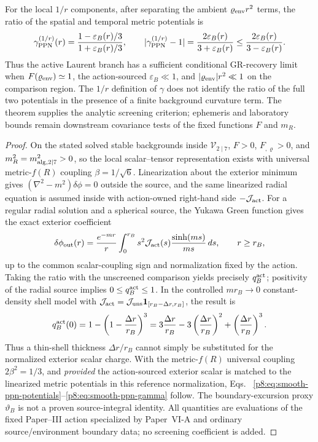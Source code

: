 \documentclass[12pt,a4paper]{article}
\begin{document}
\begin{theorem}
For the local \(1/r\) components, after separating the ambient
\(\varrho_{\rm env}r^2\) terms, the ratio of the spatial and temporal
metric potentials is
\begin{equation}
\label{p8:eq:smooth-ppn-gamma}
 \gamma_{\rm PPN}^{(1/r)}(r)
 =\frac{1-\varepsilon_B(r)/3}{1+\varepsilon_B(r)/3},
 \qquad
 |\gamma_{\rm PPN}^{(1/r)}-1|
 =\frac{2\varepsilon_B(r)}{3+\varepsilon_B(r)}
 \le\frac{2\varepsilon_B(r)}{3-\varepsilon_B(r)}.
\end{equation}
Thus the active Laurent branch has a sufficient conditional GR-recovery
limit when $F(\varrho_{\rm env})\simeq1$, the action-sourced
$\varepsilon_B\ll1$, and $|\varrho_{\rm env}|r^2\ll1$ on the comparison
region. The \(1/r\) definition of \(\gamma\) does not identify the
ratio of the full two potentials in the presence of a finite background
curvature term.  The theorem supplies the analytic screening
criterion; ephemeris and laboratory bounds remain downstream covariance tests
of the fixed functions $F$ and $m_R$.
\end{theorem}

\begin{proof}
On the stated solved stable backgrounds inside \(\mathscr V_{2\mid7}\),
\(F>0\), \(F_{,\varrho}>0\), and
\(m_R^2=m_{{\rm alg},2\mid7}^2>0\), so the local
scalar--tensor representation exists with universal metric-$f(R)$ coupling
$\beta=1/\sqrt6$.  Linearization about the exterior minimum gives
$(\nabla^2-m^2)\delta\phi=0$ outside the source, and the same
linearized radial equation is assumed inside with action-owned right-hand
side \(-\mathcal J_{\rm act}\). For a regular radial solution and a
spherical source, the Yukawa Green function gives the exact exterior
coefficient
\[
 \delta\phi_{\rm out}(r)=\frac{e^{-mr}}r
 \int_0^{r_B}s^2\mathcal J_{\rm act}(s)
                 \frac{\sinh(ms)}{ms}\,ds,
 \qquad r\geq r_B,
\]
up to the common scalar-coupling sign and normalization fixed by the
action. Taking the ratio with the unscreened comparison yields precisely
\(q_B^{\rm act}\); positivity of the radial source implies
\(0\leq q_B^{\rm act}\leq1\). In the controlled \(m r_B\to0\)
constant-density shell model with \(\mathcal J_{\rm act}=
\mathcal J_{\rm uns}\mathbf1_{[r_B-\Delta r,r_B]}\), the result is
\[
 q_B^{\rm act}(0)=1-\left(1-\frac{\Delta r}{r_B}\right)^3
  =3\frac{\Delta r}{r_B}
   -3\left(\frac{\Delta r}{r_B}\right)^2
   +\left(\frac{\Delta r}{r_B}\right)^3.
\]
Thus a thin-shell thickness \(\Delta r/r_B\) cannot simply be
substituted for the normalized exterior scalar charge. With the
metric-$f(R)$ universal coupling \(2\beta^2=1/3\), and \emph{provided}
the action-sourced exterior scalar is matched to the linearized metric
potentials in this reference normalization, Eqs.~
\eqref{p8:eq:smooth-ppn-potentials}--\eqref{p8:eq:smooth-ppn-gamma}
follow. The boundary-excursion proxy \(\vartheta_B\) is not a proven
source-integral identity.
All quantities are evaluations of the fixed Paper--III action specialized by Paper~VI-A and
ordinary source/environment boundary data; no screening coefficient is added.
\end{proof}
\end{document}
